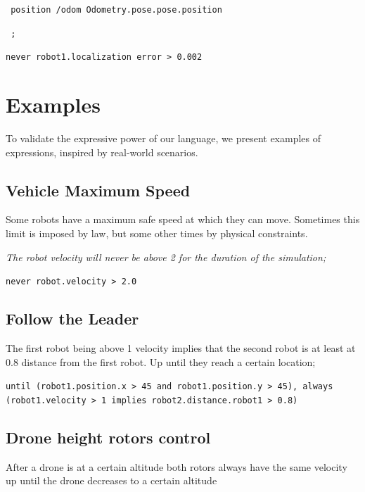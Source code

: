 \documentclass[runningheads]{llncs}
\begin{document}
\texttt{    position /odom Odometry.pose.pose.position}

\texttt{    ;}

\vspace{3mm}

\texttt{never robot1.localization error > 0.002}


\section{Examples}

To validate the expressive power of our language, we present examples of expressions, inspired by real-world scenarios.


\subsection{Vehicle Maximum Speed}

Some robots have a maximum safe speed at which they can move. Sometimes this limit is imposed by law, but some other times by physical constraints.


\textit{The robot velocity will never be above 2 for the duration of the simulation;}

\vspace{3mm}

\texttt{never robot.velocity > 2.0}

\subsection{Follow the Leader}

The first robot being above 1 velocity implies that the second robot is at least at 0.8 distance from the first robot. Up until they reach a certain location;

\vspace{3mm}

\texttt{until (robot1.position.x > 45 and robot1.position.y > 45), always (robot1.velocity > 1 implies robot2.distance.robot1 > 0.8)}


\subsection{Drone height rotors control}

After a drone is at a certain altitude both rotors always have the same velocity up until the drone decreases to a certain altitude

\vspace{3mm}
\end{document}

